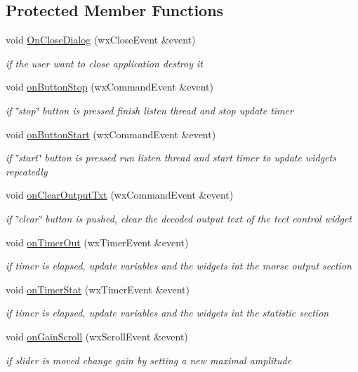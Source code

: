 \subsection*{Protected Member Functions}
\begin{DoxyCompactItemize}
\item 
void \hyperlink{classMainDialog_a17fec54d5486bc4e44052bcef47f3fcc}{On\+Close\+Dialog} (wx\+Close\+Event \&event)
\begin{DoxyCompactList}\small\item\em if the user want to close application destroy it \end{DoxyCompactList}\item 
void \hyperlink{classMainDialog_a505dcb8188eafd19d3fe21b382ec7fe7}{on\+Button\+Stop} (wx\+Command\+Event \&event)
\begin{DoxyCompactList}\small\item\em if \char`\"{}stop\char`\"{} button is pressed finish listen thread and stop update timer \end{DoxyCompactList}\item 
void \hyperlink{classMainDialog_a4feedd725b68a028c72c2227c4c55976}{on\+Button\+Start} (wx\+Command\+Event \&event)
\begin{DoxyCompactList}\small\item\em if \char`\"{}start\char`\"{} button is pressed run listen thread and start timer to update widgets repeatedly \end{DoxyCompactList}\item 
void \hyperlink{classMainDialog_a121d263ec1ae91147a8947dad64b984f}{on\+Clear\+Output\+Txt} (wx\+Command\+Event \&event)
\begin{DoxyCompactList}\small\item\em if \char`\"{}clear\char`\"{} button is pushed, clear the decoded output text of the tect control widget \end{DoxyCompactList}\item 
void \hyperlink{classMainDialog_a562ef211b7cfd5ae24a9f04f41ccb67e}{on\+Timer\+Out} (wx\+Timer\+Event \&event)
\begin{DoxyCompactList}\small\item\em if timer is elapsed, update variables and the widgets int the morse output section \end{DoxyCompactList}\item 
void \hyperlink{classMainDialog_a2b15d3ae06d0b3e1246bcd012f8f758a}{on\+Timer\+Stat} (wx\+Timer\+Event \&event)
\begin{DoxyCompactList}\small\item\em if timer is elapsed, update variables and the widgets int the statistic section \end{DoxyCompactList}\item 
void \hyperlink{classMainDialog_a6c56256388bab3fe16995c722a072d33}{on\+Gain\+Scroll} (wx\+Scroll\+Event \&event)
\begin{DoxyCompactList}\small\item\em if slider is moved change gain by setting a new maximal amplitude \end{DoxyCompactList}\end{DoxyCompactItemize}

